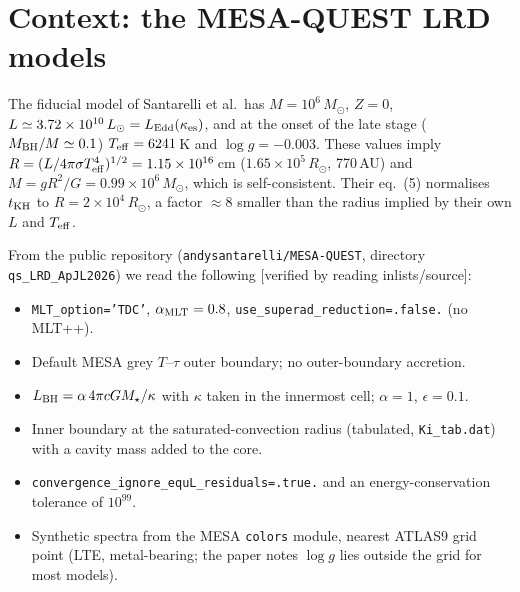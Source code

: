 \documentclass[11pt]{article}
\newcommand{\Msun}{M_\odot}
\newcommand{\kes}{\kappa_{\rm es}}
\newcommand{\status}[1]{\textsf{\small\textcolor{black!60}{[#1]}}}
\begin{document}
\section{Context: the MESA-QUEST LRD models}
The fiducial model of Santarelli et al.\ has $M=10^6\,\Msun$, $Z=0$, $L\simeq3.72\times10^{10}\,L_\odot
=L_{\rm Edd}(\kes)$, and at the onset of the late stage ($M_{\rm BH}/M\simeq0.1$) $T_{\rm eff}=6241$\,K and
$\log g=-0.003$. These values imply $R=(L/4\pi\sigma T_{\rm eff}^4)^{1/2}=1.15\times10^{16}$\,cm
($1.65\times10^5\,R_\odot$, 770\,AU) and $M=gR^2/G=0.99\times10^6\,\Msun$, which is self-consistent. Their
eq.~(5) normalises $t_{\rm KH}$ to $R=2\times10^4\,R_\odot$, a factor $\approx8$ smaller than the radius implied by their own
$L$ and $T_{\rm eff}$.

From the public repository (\texttt{andysantarelli/MESA-QUEST}, directory \texttt{qs\_LRD\_ApJL2026}) we
read the following \status{verified by reading inlists/source}:
\begin{itemize}
\item \texttt{MLT\_option='TDC'}, $\alpha_{\rm MLT}=0.8$, \texttt{use\_superad\_reduction=.false.} (no MLT++).
\item Default MESA grey $T$--$\tau$ outer boundary; no outer-boundary accretion.
\item $L_{\rm BH}=\alpha\,4\pi cGM_\star/\kappa$ with $\kappa$ taken in the innermost cell; $\alpha=1$, $\epsilon=0.1$.
\item Inner boundary at the saturated-convection radius (tabulated, \texttt{Ki\_tab.dat}) with a cavity mass added to the core.
\item \texttt{convergence\_ignore\_equL\_residuals=.true.} and an energy-conservation tolerance of $10^{99}$.
\item Synthetic spectra from the MESA \texttt{colors} module, nearest ATLAS9 grid point (LTE, metal-bearing; the
paper notes $\log g$ lies outside the grid for most models).
\end{itemize}
\end{document}
